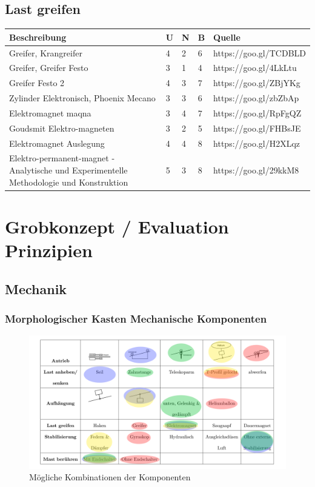 \documentclass[a4paper]{report}
\begin{document}
\section{Last greifen}
\begin{tabular}{|p{}|p{}|p{}|p{}|p{}|}
	\hline
	\textbf{Beschreibung} & \textbf{U} & \textbf{N} & \textbf{B} & \textbf{Quelle} \\
	\hline
	Greifer, Krangreifer &4 &2 &6 & https://goo.gl/TCDBLD \\
	\hline
	Greifer, Greifer Festo &3 &1 &4 & https://goo.gl/4LkLtu\\
	\hline
	Greifer Festo 2 &4 &3 &7 & https://goo.gl/ZBjYKg\\
	\hline
	Zylinder Elektronisch, Phoenix Mecano &3 &3 &6 & https://goo.gl/zbZbAp\\
	\hline
	Elektromagnet maqna &3 &4 &7 & https://goo.gl/RpFgQZ\\
	\hline
	Goudsmit Elektro-magneten &3 &2 &5 & https://goo.gl/FHBsJE\\
	\hline
	Elektromagnet Auslegung &4 &4 &8 & https://goo.gl/H2XLqz\\
	\hline
	Elektro-permanent-magnet - Analytische und Experimentelle Methodologie und Konstruktion & 5 & 3 & 8 & https://goo.gl/29kkM8\\
  \hline
\end{tabular}

\chapter{Grobkonzept / Evaluation Prinzipien}

\section{Mechanik}

\subsection{Morphologischer Kasten Mechanische Komponenten}
\begin{figure}[h!]
	\includegraphics[keepaspectratio,width=\textwidth]{MorphKasten}
	\caption{Mögliche Kombinationen der Komponenten}
	\label{fig:Morphkasten}
\end{figure}
\clearpage
\end{document}
